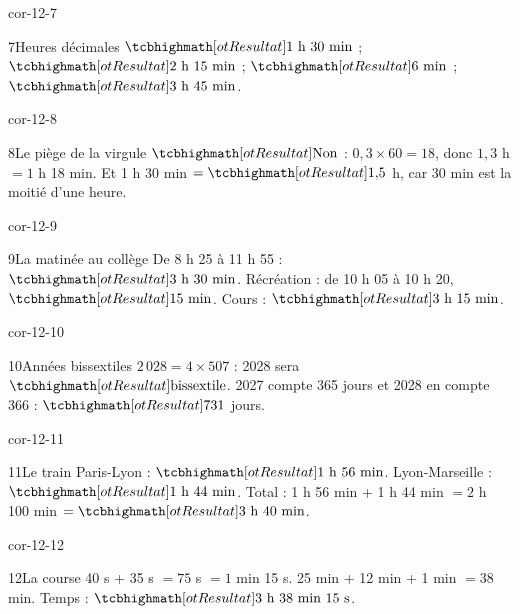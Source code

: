 \begin{blocLivre}{cor-12-7}\begin{corrige}{7}{Heures décimales}
$\res{1\text{ h }30\text{ min}}$ ; $\res{2\text{ h }15\text{ min}}$ ; $\res{6\text{ min}}$ ; $\res{3\text{ h }45\text{ min}}$.
\end{corrige}\end{blocLivre}
\begin{blocLivre}{cor-12-8}\begin{corrige}{8}{Le piège de la virgule}
$\res{\text{Non}}$ : $0{,}3\times60=18$, donc $1{,}3$ h $=1$ h 18 min. Et 1 h 30 min $=\res{1{,}5}$ h, car 30 min est la moitié d’une heure.
\end{corrige}\end{blocLivre}
\begin{blocLivre}{cor-12-9}\begin{corrige}{9}{La matinée au collège}
De 8 h 25 à 11 h 55 : $\res{3\text{ h }30\text{ min}}$. Récréation : de 10 h 05 à 10 h 20, $\res{15\text{ min}}$. Cours : $\res{3\text{ h }15\text{ min}}$.
\label{fig-cor-12-9}
\end{corrige}\end{blocLivre}
\begin{blocLivre}{cor-12-10}\begin{corrige}{10}{Années bissextiles}
$2\,028=4\times507$ : 2028 sera $\res{\text{bissextile}}$. 2027 compte 365 jours et 2028 en compte 366 : $\res{731}$ jours.
\end{corrige}\end{blocLivre}
\begin{blocLivre}{cor-12-11}\begin{corrige}{11}{Le train}
Paris-Lyon : $\res{1\text{ h }56\text{ min}}$. Lyon-Marseille : $\res{1\text{ h }44\text{ min}}$. Total : 1 h 56 min + 1 h 44 min $=2$ h 100 min $=\res{3\text{ h }40\text{ min}}$.
\end{corrige}\end{blocLivre}
\begin{blocLivre}{cor-12-12}\begin{corrige}{12}{La course}
40 s + 35 s $=75$ s $=1$ min 15 s. 25 min + 12 min + 1 min $=38$ min. Temps : $\res{3\text{ h }38\text{ min }15\text{ s}}$.
\end{corrige}\end{blocLivre}
